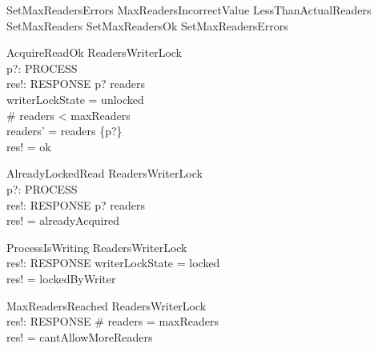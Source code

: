 \documentclass{article}
\begin{document}


\begin{zed}
SetMaxReadersErrors  MaxReadersIncorrectValue \lor LessThanActualReaders 
\also
SetMaxReaders  SetMaxReadersOk \lor SetMaxReadersErrors
\end{zed}

\begin{schema}{AcquireReadOk}
    \Delta ReadersWriterLock \\
    p?: PROCESS \\
    res!: RESPONSE
\where
    p? \notin readers \\
    writerLockState = unlocked \\
    \# readers < maxReaders \\
    readers' = readers \cup \{p?\} \\
    res! = ok
\end{schema}

\begin{schema}{AlreadyLockedRead}
    \Xi ReadersWriterLock \\
    p?: PROCESS \\
    res!: RESPONSE
\where
    p? \in readers \\
    res! = alreadyAcquired
\end{schema}

\begin{schema}{ProcessIsWriting}
    \Xi ReadersWriterLock \\
    res!: RESPONSE
\where
    writerLockState = locked \\
    res! = lockedByWriter
\end{schema}

\begin{schema}{MaxReadersReached}
    \Xi ReadersWriterLock \\
    res!: RESPONSE
\where
    \# readers = maxReaders \\
    res! = cantAllowMoreReaders
\end{schema}
\end{document}
